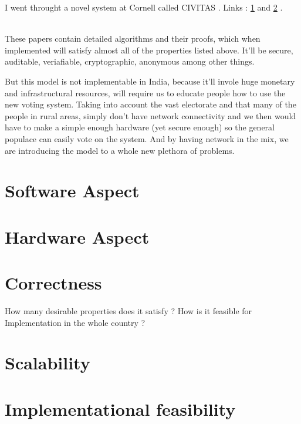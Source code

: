 \documentclass[12pt]{report}
\begin{document}
I went throught a novel system at Cornell called CIVITAS . Links : \href{https://www.cs.cornell.edu/projects/civitas/papers/clarkson_civitas.pdf}{1} and \href{https://www.cs.cornell.edu/~clarkson/papers/clarkson_civitas_tr.pdf}{2} .

\vspace{0.5cm}

\\
These papers contain detailed algorithms and their proofs, which when implemented will satisfy almost all of the properties listed above. It'll be secure, auditable, veriafiable, cryptographic, anonymous among other things.
\\

\vspace{0.5cm}

But this model is not implementable in India, because it'll invole huge monetary and infrastructural resources, will require us to educate people how to use the new voting system. Taking into account the vast electorate and that many of the people in rural areas, simply don't have network connectivity and we then would have to make a simple enough hardware (yet secure enough) so the general populace can easily vote on the system. 
And by having network in the mix, we are introducing the model to a whole new plethora of problems.

\section{Software Aspect}
\section{Hardware Aspect}
\section{Correctness}
How many desirable properties does it satisfy ? How is it feasible for Implementation in the whole country ?
\section{Scalability}
\section{Implementational feasibility}


\end{document}
